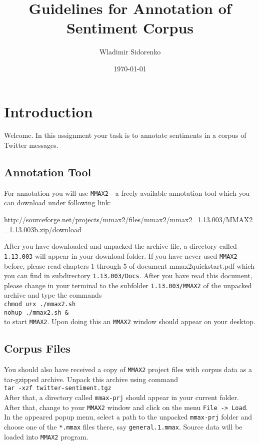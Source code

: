 \documentclass[11pt,a4paper]{article}
\author{Wladimir Sidorenko}
\date{\today}
\title{Guidelines for Annotation of Sentiment Corpus}
\begin{document}
\maketitle{}
\section{Introduction}
Welcome. In this assignment your task is to annotate sentiments in a
corpus of Twitter messages.

\subsection{Annotation Tool}

For annotation you will use \texttt{MMAX2} - a freely available
annotation tool which you can download under following link:

\url{http://sourceforge.net/projects/mmax2/files/mmax2/mmax2_1.13.003/MMAX2_1.13.003b.zip/download}

After you have downloaded and unpacked the archive file, a directory
called \texttt{1.13.003} will appear in your download folder. If you
have never used \texttt{MMAX2} before, please read chapters 1 through
5 of document mmax2quickstart.pdf which you can find in subdirectory
\texttt{1.13.003/Docs}. After you have read this document, please
change in your terminal to the subfolder \texttt{1.13.003/MMAX2} of
the unpacked archive and type the commands\\ \texttt{chmod u+x
  ./mmax2.sh}\\ \texttt{nohup ./mmax2.sh \&}\\ to start
\texttt{MMAX2}. Upon doing this an \texttt{MMAX2} window should appear
on your desktop.

\subsection{Corpus Files}

You should also have received a copy of \texttt{MMAX2} project files
with corpus data as a tar-gzipped archive. Unpack this archive using
command\\\texttt{tar -xzf twitter-sentiment.tgz}\\After that, a
directory called \texttt{mmax-prj} should appear in your current
folder. After that, change to your \texttt{MMAX2} window and click on
the menu \texttt{File -> Load}. In the appeared popup menu, select a
path to the unpacked \texttt{mmax-prj} folder and choose one of the
\texttt{*.mmax} files there, say \texttt{general.1.mmax}. Source data
will be loaded into \texttt{MMAX2} program.
\end{document}
